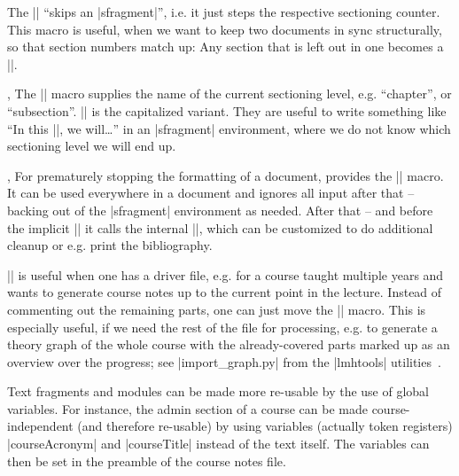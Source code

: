 \begin{function}{\skipfragment}
  The |\skipfragment| ``skips an |sfragment|'', i.e. it just steps the respective sectioning
  counter. This macro is useful, when we want to keep two documents in sync structurally,
  so that section numbers match up: Any section that is left out in one becomes a
  |\skipfragment|.
\end{function}

\begin{function}{\currentsectionlevel,\CurrentSectionLevel}
  The |\currentsectionlevel| macro supplies the name of the current sectioning level,
  e.g. ``chapter'', or ``subsection''. |\CurrentSectionLevel| is the capitalized
  variant. They are useful to write something like ``In this |\currentsectionlevel|, we
  will\ldots'' in an |sfragment| environment, where we do not know which sectioning level we
  will end up.
\end{function}

\begin{function}{\prematurestop,\afterprematurestop}
  For prematurely stopping the formatting of a document, \sTeX provides the
  |\prematurestop| macro. It can be used everywhere in a document and ignores all input
  after that -- backing out of the |sfragment| environment as needed. After that -- and
  before the implicit || it calls the internal |\afterprematurestop|, which
  can be customized to do additional cleanup or e.g. print the bibliography.

  |\prematurestop| is useful when one has a driver file, e.g. for a course taught multiple
  years and wants to generate course notes up to the current point in the lecture. Instead
  of commenting out the remaining parts, one can just move the |\prematurestop| macro.
  This is especially useful, if we need the rest of the file for processing, e.g. to
  generate a theory graph of the whole course with the already-covered parts marked up as
  an overview over the progress; see |import_graph.py| from the |lmhtools|
  utilities~\cite{lmhtools:github:on}.
\end{function}

Text fragments and modules can be made more re-usable by the use of global variables. For
instance, the admin section of a course can be made course-independent (and therefore
re-usable) by using variables (actually token registers) |courseAcronym| and |courseTitle|
instead of the text itself. The variables can then be set in the \sTeX preamble of the
course notes file.
  
